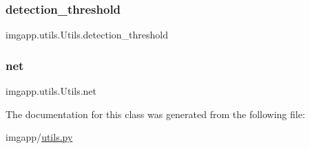 \subsubsection{\texorpdfstring{detection\+\_\+threshold}{detection\_threshold}}
{\footnotesize\ttfamily imgapp.\+utils.\+Utils.\+detection\+\_\+threshold}

\mbox{\label{classimgapp_1_1utils_1_1Utils_a421da25276568d870b9f3347dfdea33e}} 
\subsubsection{\texorpdfstring{net}{net}}
{\footnotesize\ttfamily imgapp.\+utils.\+Utils.\+net}



The documentation for this class was generated from the following file\+:\begin{DoxyCompactItemize}
\item 
imgapp/\hyperlink{utils_8py}{utils.\+py}\end{DoxyCompactItemize}
